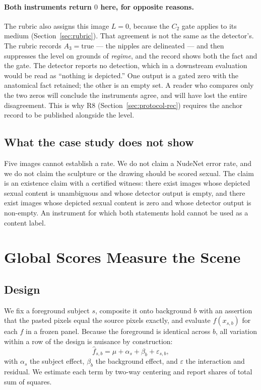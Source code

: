 \documentclass[11pt]{article}
\begin{document}
\paragraph{Both instruments return $0$ here, for opposite reasons.} The rubric also assigns this image $L=0$, because the $C_2$ gate applies to its medium (Section~\ref{sec:rubric}). That agreement is not the same as the detector's. The rubric records $A_3=\text{true}$ --- the nipples are delineated --- and then suppresses the level on grounds of \emph{regime}, and the record shows both the fact and the gate. The detector reports no detection, which in a downstream evaluation would be read as ``nothing is depicted.'' One output is a gated zero with the anatomical fact retained; the other is an empty set. A reader who compares only the two zeros will conclude the instruments agree, and will have lost the entire disagreement. This is why R8 (Section~\ref{sec:protocol-rec}) requires the anchor record to be published alongside the level.

\subsection{What the case study does not show}
Five images cannot establish a rate. We do not claim a NudeNet error rate, and we do not claim the sculpture or the drawing should be scored sexual. The claim is an existence claim with a certified witness: there exist images whose depicted sexual content is unambiguous and whose detector output is empty, and there exist images whose depicted sexual content is zero and whose detector output is non-empty. An instrument for which both statements hold cannot be used as a content label.

\section{Global Scores Measure the Scene}
\label{sec:sweep}
\subsection{Design}
We fix a foreground subject $s$, composite it onto background $b$ with an assertion that the pasted pixels equal the source pixels exactly, and evaluate $f(x_{s,b})$ for each $f$ in a frozen panel. Because the foreground is identical across $b$, all variation within a row of the design is nuisance by construction:
\begin{equation}
 \hat f_{s,b}=\mu+\alpha_s+\beta_b+\varepsilon_{s,b},
 \label{eq:decomp}
\end{equation}
with $\alpha_s$ the subject effect, $\beta_b$ the background effect, and $\varepsilon$ the interaction and residual. We estimate each term by two-way centering and report shares of total sum of squares.
\end{document}
